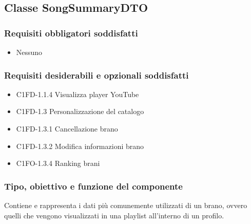 \subsection{Classe SongSummaryDTO}
\subsubsection*{Requisiti obbligatori soddisfatti}
\begin{itemize}
    \item Nessuno
\end{itemize}
\subsubsection*{Requisiti desiderabili e opzionali soddisfatti}
\begin{itemize}
    \item C1FD-1.1.4 Visualizza player YouTube
    \item C1FD-1.3 Personalizzazione del catalogo
    \item C1FD-1.3.1 Cancellazione brano
    \item C1FD-1.3.2 Modifica informazioni brano
    \item C1FO-1.3.4 Ranking brani
\end{itemize}
\subsubsection*{Tipo, obiettivo e funzione del componente}
Contiene e rappresenta i dati pi\`u comunemente utilizzati di un brano, ovvero
quelli che vengono visualizzati in una playlist all'interno di un profilo.
